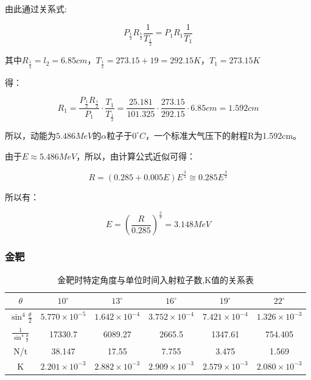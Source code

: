 \documentclass[a4paper,UTF8]{ctexart}
\begin{document}
由此通过关系式:

\begin{equation}
    P_{\frac{1}{2}}R_{\frac{1}{2}} \frac{1}{T_{\frac{1}{2}}} = P_{1}R_{1} \frac{1}{T_1}
\end{equation}

其中$R_{\frac{1}{2}} = l_2 = 6.85cm$，$T_{\frac{1}{2}}=273.15 + 19 = 292.15K$，$T_1 = 273.15K$

得：

\begin{equation}
    R_{1} = \frac{P_{\frac{1}{2}}R_{\frac{1}{2}}}{P_1} \cdot \frac{T_1}{T_{\frac{1}{2}}}= \frac{25.181}{101.325}\cdot \frac{273.15}{292.15} \cdot 6.85cm = 1.592cm
\end{equation}

所以，动能为$5.486MeV$的$\alpha$粒子于$0^\circ C$，一个标准大气压下的射程R为1.592cm。

由于$E \approx 5.486 MeV$，所以，由计算公式近似可得：

\begin{equation}
    R = (0.285+0.005E)E^{\frac{3}{2}} \cong 0.285E^{\frac{3}{2}}
\end{equation}

所以有：

\begin{equation}
    E = (\frac{R}{0.285})^{\frac{2}{3}} = 3.148 MeV
\end{equation}

\subsubsection{金靶}

\begin{table}[H]
    \centering
    \begin{tabular}{|c|c|c|c|c|c|}
    \hline
        $\theta$ & $10^\circ$ & $13^\circ$ & $16^\circ$ & $19^\circ$ & $22^\circ$ \\ \hline
        $\sin^4{\frac{\theta}{2}}$ & $5.770 \times 10^{-5}$ & $1.642 \times 10^{-4}$ & $3.752 \times 10^{-4}$ & $7.421 \times 10^{-4}$ & $1.326 \times 10^{-3}$ \\ \hline
        $\frac{1}{\sin^4{\frac{\theta}{2}}}$ & 17330.7 & 6089.27 & 2665.5 & 1347.61 & 754.405 \\ \hline
        N/t & 38.147 & 17.55 & 7.755 & 3.475 & 1.569 \\ \hline
        K & $2.201 \times 10^{-3}$ & $2.882 \times 10^{-3}$ & $2.909 \times 10^{-3}$ & $2.579 \times 10^{-3}$ & $2.080 \times 10^{-3}$ \\ \hline
    \end{tabular}
    \caption{金靶时特定角度与单位时间入射粒子数,K值的关系表}
\end{table}
\end{document}
